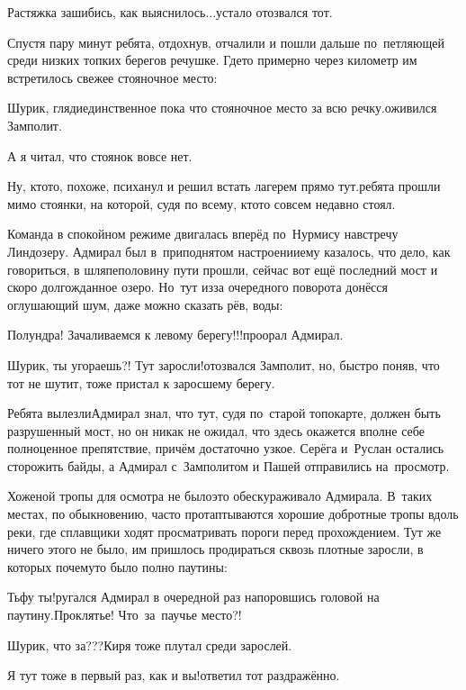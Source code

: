 \diagdash Растяжка зашибись, как выяснилось$\ldots$\mdash устало отозвался тот.

Спустя пару минут ребята, отдохнув, отчалили и пошли дальше по~петляющей среди низких топких берегов речушке. Где\sdash то примерно через километр им встретилось свежее стояночное место:

\diagdash Шурик, гляди\mdash единственное пока что стояночное место за всю речку.\mdash оживился Замполит.

\diagdash А я читал, что стоянок вовсе нет.

\diagdash Ну, кто\sdash то, похоже, психанул и решил встать лагерем прямо тут.\mdash ребята прошли мимо стоянки, на которой, судя по всему, кто\sdash то совсем недавно стоял.

Команда в спокойном режиме двигалась вперёд по~Нурмису навстречу Линдозеру. Адмирал был в~приподнятом настроении\mdash ему казалось, что дело, как говориться, в шляпе\mdash половину пути прошли, сейчас вот ещё последний мост и скоро долгожданное озеро. Но~тут из\sdash за очередного поворота донёсся оглушающий шум, даже можно сказать рёв, воды:

\diagdash Полундра! Зачаливаемся к левому берегу!!!\mdash проорал Адмирал.

\diagdash Шурик, ты угораешь?! Тут заросли!\mdash отозвался Замполит, но, быстро поняв, что тот не шутит, тоже пристал к заросшему берегу.

Ребята вылезли\mdash Адмирал знал, что тут, судя по~старой топокарте, должен быть разрушенный мост, но он никак не ожидал, что здесь окажется вполне себе полноценное препятствие, причём достаточно узкое. Серёга и~Руслан остались сторожить байды, а Адмирал с~Замполитом и Пашей отправились на~просмотр. 

Хоженой тропы для осмотра не было\mdash это обескураживало Адмирала. В~таких местах, по обыкновению, часто протаптываются хорошие добротные тропы вдоль реки, где сплавщики ходят просматривать пороги перед прохождением. Тут же ничего этого не было, им пришлось продираться сквозь плотные заросли, в которых почему\sdash то было полно паутины:

\diagdash Тьфу ты!\mdash ругался Адмирал в очередной раз напоровшись головой на паутину.\mdash Проклятье! Что~за~паучье место?!

\diagdash Шурик, что за???\mdash Киря тоже плутал среди зарослей.

\diagdash Я тут тоже в первый раз, как и вы!\mdash ответил тот раздражённо. 

